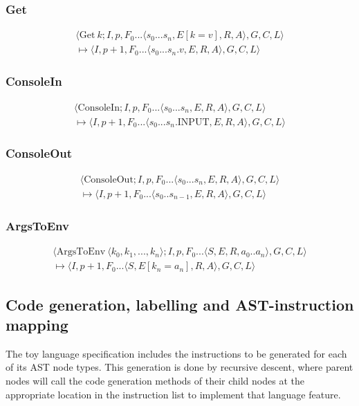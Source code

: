 \subsubsection{Get}
\begin{multline*}
\langle \text{Get}\ k; I, p, F_0...\langle s_0...s_n, E[k=v], R, A\rangle , G, C, L\rangle  \\ \mapsto \langle I, p+1, F_0...\langle s_0...s_n.v, E, R, A\rangle , G, C, L\rangle 
\end{multline*}
\subsubsection{ConsoleIn}
\begin{multline*}
\langle \text{ConsoleIn}; I, p, F_0...\langle s_0...s_n, E, R, A\rangle , G, C, L\rangle  \\ \mapsto \langle I, p+1, F_0...\langle s_0...s_n.\text{INPUT}, E, R, A\rangle , G, C, L\rangle 
\end{multline*}
\subsubsection{ConsoleOut}
\begin{multline*}
\langle \text{ConsoleOut}; I, p, F_0...\langle s_0...s_n, E, R, A\rangle , G, C, L\rangle  \\ \mapsto \langle I, p+1, F_0...\langle s_0..s_{n-1}, E, R, A\rangle , G, C, L\rangle 
\end{multline*}
\subsubsection{ArgsToEnv}
\begin{multline*}
\langle \text{ArgsToEnv}\ \langle k_0, k_1, ..., k_n\rangle ; I, p, F_0...\langle S, E, R, a_0..a_n \rangle, G, C, L \rangle \\ \mapsto \langle I, p+1, F_0...\langle S, E[k_n = a_n], R, A\rangle , G, C, L \rangle
\end{multline*}
\subsection{Code generation, labelling and AST-instruction mapping}

The toy language specification includes the instructions to be generated for each of its AST node types. This generation is done by recursive descent, where parent nodes will call the code generation methods of their child nodes at the appropriate location in the instruction list to implement that language feature.

